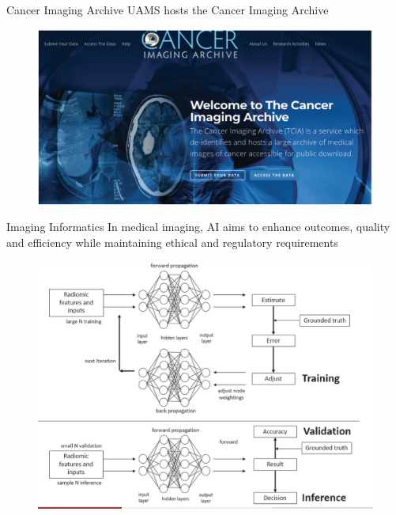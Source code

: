 \documentclass{beamer}
\begin{document}
	\begin{frame}{Cancer Imaging Archive}
		UAMS hosts the Cancer Imaging Archive
		\begin{figure}[h]
			\centering
			\includegraphics[scale=0.45]{Figures/TCIA.png}
		\end{figure}
		
	\end{frame}
	
	\begin{frame}{Imaging Informatics}
		In medical imaging, AI aims to enhance outcomes, quality and efficiency
		while maintaining ethical and regulatory requirements
		
		\begin{figure}[h]
			\centering
			\includegraphics[scale=0.45]{Figures/imaging_informatics.png}
		\end{figure}
		
	\end{frame}
	
\end{document}
